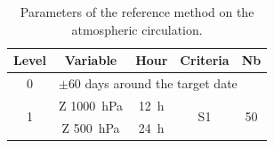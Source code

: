 \documentclass[twocol]{ametsoc}
\begin{document}
%

\begin{table}[htbp]
	\footnotesize
	\caption{Parameters of the reference method on the atmospheric circulation.}
	\begin{center}
		\begin{tabular}{ccccc}
			\hline \textbf{Level} & \textbf{Variable} & \textbf{Hour} & \textbf{Criteria} & \textbf{Nb} \\ 
			\hline 
			0 & \multicolumn{4}{l}{$\pm 60$ days around the target date} \\
			\hline 
			\multirow{2}{*}{1} & Z 1000~hPa & 12~h & \multirow{2}{*}{S1} & \multirow{2}{*}{50} \\
			& Z 500~hPa & 24~h & & \\ 
			\hline 
		\end{tabular} 
	\end{center}
	\label{table:params_R1}
\end{table}
\end{document}
